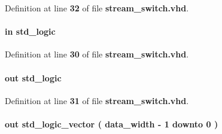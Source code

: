 Definition at line {\bf 32} of file {\bf stream\+\_\+switch.\+vhd}.

\paragraph[{tx\+\_\+fifo\+\_\+rdy}]{ {\bfseries \textcolor{keywordflow}{in}\textcolor{vhdlchar}{ }} {\bfseries \textcolor{comment}{std\+\_\+logic}\textcolor{vhdlchar}{ }} \hspace{0.3cm}{\ttfamily [Port]}}\label{classstream__switch_a42521c54f58ae5f51944dff34eb7d3a3}


Definition at line {\bf 30} of file {\bf stream\+\_\+switch.\+vhd}.

\paragraph[{tx\+\_\+fifo\+\_\+wr}]{ {\bfseries \textcolor{keywordflow}{out}\textcolor{vhdlchar}{ }} {\bfseries \textcolor{comment}{std\+\_\+logic}\textcolor{vhdlchar}{ }} \hspace{0.3cm}{\ttfamily [Port]}}\label{classstream__switch_a44df978b1db40d2ce415146ec219f5e1}


Definition at line {\bf 31} of file {\bf stream\+\_\+switch.\+vhd}.

\paragraph[{wfm\+\_\+data}]{ {\bfseries \textcolor{keywordflow}{out}\textcolor{vhdlchar}{ }} {\bfseries \textcolor{comment}{std\+\_\+logic\+\_\+vector}\textcolor{vhdlchar}{ }\textcolor{vhdlchar}{(}\textcolor{vhdlchar}{ }\textcolor{vhdlchar}{ }\textcolor{vhdlchar}{ }\textcolor{vhdlchar}{ }{\bfseries {\bf data\+\_\+width}} \textcolor{vhdlchar}{-\/}\textcolor{vhdlchar}{ } \textcolor{vhdldigit}{1} \textcolor{vhdlchar}{ }\textcolor{keywordflow}{downto}\textcolor{vhdlchar}{ }\textcolor{vhdlchar}{ } \textcolor{vhdldigit}{0} \textcolor{vhdlchar}{ }\textcolor{vhdlchar}{)}\textcolor{vhdlchar}{ }} \hspace{0.3cm}{\ttfamily [Port]}}\label{classstream__switch_ac7f55bfc3578eb55f2dd9b8c25b3b4c1}


